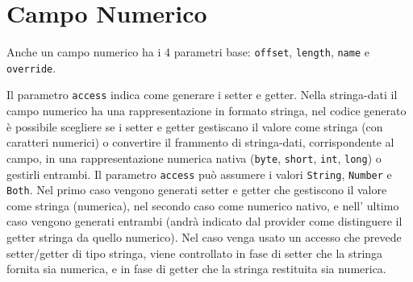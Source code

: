 \documentclass[a4paper,10pt]{report}
\begin{document}
\section{Campo Numerico}\label{sec:spi.num}
Anche un campo numerico ha i 4 parametri base: \verb!offset!, \verb!length!,
\verb!name! e \verb!override!.

Il parametro \verb!access! indica come generare i setter e getter. 
Nella stringa-dati il campo numerico ha una rappresentazione in formato stringa, 
nel codice generato è possibile scegliere se i setter e getter gestiscano il 
valore come stringa (con caratteri numerici) o convertire il frammento di 
stringa-dati, corrispondente al campo, in una rappresentazione numerica nativa 
(\verb!byte!, \verb!short!, \verb!int!, \verb!long!) o gestirli entrambi.
%
Il parametro \verb!access! può assumere i valori \verb!String!, \verb!Number! e 
\verb!Both!. Nel primo caso vengono generati setter e getter che gestiscono il 
valore come stringa (numerica), nel secondo caso come numerico nativo, e 
nell’ ultimo caso vengono generati entrambi (andrà indicato dal provider come 
distinguere il getter stringa da quello numerico). Nel caso venga usato un 
accesso che prevede setter/getter di tipo stringa, viene controllato in fase di 
setter che la stringa fornita sia numerica, e in fase di getter che la stringa 
restituita sia numerica.
\end{document}
